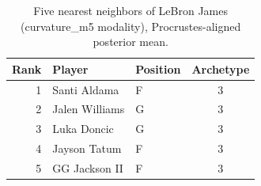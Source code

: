 \begin{table}[htbp]
  \centering\small
  \begin{tabular}{rllc}
    \toprule
    Rank & Player & Position & Archetype \\
    \midrule
    1 & Santi Aldama & F & 3 \\
    2 & Jalen Williams & G & 3 \\
    3 & Luka Doncic & G & 3 \\
    4 & Jayson Tatum & F & 3 \\
    5 & GG Jackson II & F & 3 \\
    \bottomrule
  \end{tabular}
  \caption{Five nearest neighbors of LeBron James (curvature_m5 modality), Procrustes-aligned posterior mean.}
  \label{tab:LeBron_James_neighbors_curvature_m5}
\end{table}

